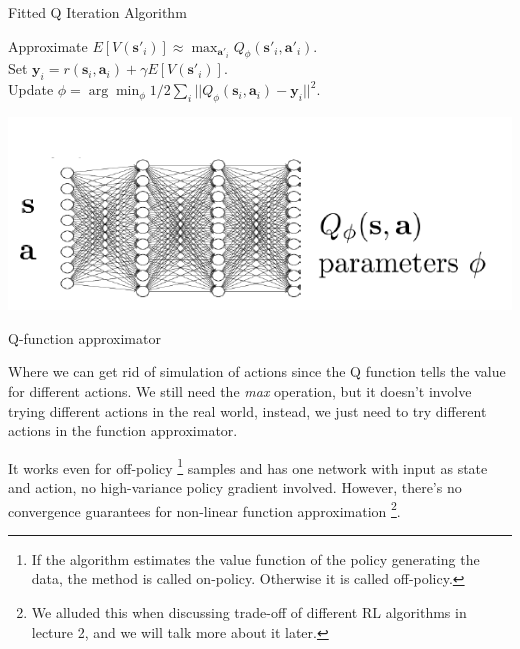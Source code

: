 \documentclass{tufte-handout}
\newcommand{\s}{\mathbf{s}}
\newcommand{\act}{\mathbf{a}}
\begin{document}
\begin{algorithm}

  \caption{Fitted Q Iteration Algorithm}
    \label{algo:fit-q}
    \begin{algorithmic}[1]
    \STATE Approximate $E[V(\s'_i)]  \approx  \max_{\act'_i} Q_\phi(\s'_i, \act'_i)$. \\
    \STATE Set $\mathbf{y}_i = r(\s_i, \act_i) +\gamma E[V(\s'_i)]$. \\
    \STATE Update $\phi = \arg \min_\phi 1/2 \sum_i || Q_\phi(\s_i, \act_i) - \mathbf{y}_i|| ^2 $. \\
    \ENDWHILE
  \end{algorithmic}
\end{algorithm}

\begin{marginfigure}
\label{fig:q-net}
\includegraphics[width=\linewidth]{q-net}
\caption{Q-function approximator}
\end{marginfigure}

Where we can get rid of simulation of actions since the Q function tells the value for different actions. We still need the \emph{max} operation,
but it doesn't involve trying different actions in the real world, instead, we just need to try different actions in the function approximator.

It works even for off-policy \thanks{If the algorithm estimates the value function of the policy generating the data, the method is called on-policy.
Otherwise it is called off-policy.} samples and has one network with input as state and action, no high-variance policy gradient involved. However, there's no convergence guarantees for non-linear function approximation \thanks{We alluded this when discussing trade-off of different RL algorithms in lecture 2, and we will talk more about it later.}.
\end{document}
